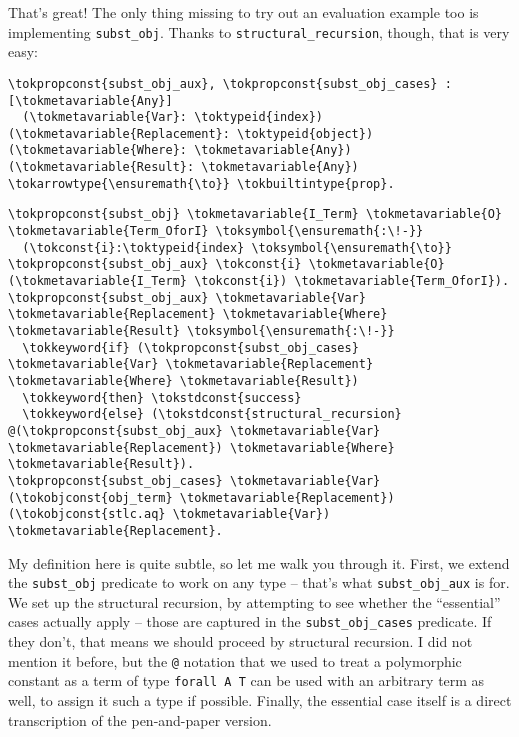 \heroADVISOR{} That's great! The only thing missing to try out an evaluation
example too is implementing \texttt{subst\_obj}. Thanks to
\texttt{structural\_recursion}, though, that is very easy:

\begin{verbatim}
\tokpropconst{subst_obj_aux}, \tokpropconst{subst_obj_cases} : [\tokmetavariable{Any}]
  (\tokmetavariable{Var}: \toktypeid{index}) (\tokmetavariable{Replacement}: \toktypeid{object}) (\tokmetavariable{Where}: \tokmetavariable{Any}) (\tokmetavariable{Result}: \tokmetavariable{Any}) \tokarrowtype{\ensuremath{\to}} \tokbuiltintype{prop}.
\end{verbatim}

\begin{verbatim}
\tokpropconst{subst_obj} \tokmetavariable{I_Term} \tokmetavariable{O} \tokmetavariable{Term_OforI} \toksymbol{\ensuremath{:\!-}}
  (\tokconst{i}:\toktypeid{index} \toksymbol{\ensuremath{\to}} \tokpropconst{subst_obj_aux} \tokconst{i} \tokmetavariable{O} (\tokmetavariable{I_Term} \tokconst{i}) \tokmetavariable{Term_OforI}).
\tokpropconst{subst_obj_aux} \tokmetavariable{Var} \tokmetavariable{Replacement} \tokmetavariable{Where} \tokmetavariable{Result} \toksymbol{\ensuremath{:\!-}}
  \tokkeyword{if} (\tokpropconst{subst_obj_cases} \tokmetavariable{Var} \tokmetavariable{Replacement} \tokmetavariable{Where} \tokmetavariable{Result})
  \tokkeyword{then} \tokstdconst{success}
  \tokkeyword{else} (\tokstdconst{structural_recursion} @(\tokpropconst{subst_obj_aux} \tokmetavariable{Var} \tokmetavariable{Replacement}) \tokmetavariable{Where} \tokmetavariable{Result}).
\tokpropconst{subst_obj_cases} \tokmetavariable{Var} (\tokobjconst{obj_term} \tokmetavariable{Replacement}) (\tokobjconst{stlc.aq} \tokmetavariable{Var}) \tokmetavariable{Replacement}.
\end{verbatim}

\noindent
My definition here is quite subtle, so let me walk you through it.
First, we extend the \texttt{subst\_obj} predicate to work on any type
-- that's what \texttt{subst\_obj\_aux} is for. We set up the structural
recursion, by attempting to see whether the ``essential'' cases actually
apply -- those are captured in the \texttt{subst\_obj\_cases} predicate.
If they don't, that means we should proceed by structural recursion. I
did not mention it before, but the \texttt{@} notation that we used to
treat a polymorphic constant as a term of type \texttt{forall\ A\ T} can
be used with an arbitrary term as well, to assign it such a type if
possible. Finally, the essential case itself is a direct transcription
of the pen-and-paper version.

